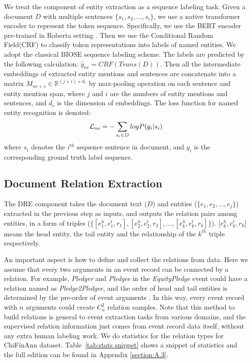 \documentclass[11pt]{article}
\begin{document}
We treat the component of entity extraction as a sequence labeling task. Given a document $D$ with multiple sentences $\{s_1,s_2,...,s_i\}$, we use a native transformer encoder to represent the token sequence. Specifically, we use the BERT \cite{bert} encoder pre-trained in Roberta setting \cite{roberta}. Then we use the Conditional Random Field(CRF) \cite{CRF} to classify token representations into labels of named entities. We adopt the classical BIOSE sequence labeling scheme. The labels are predicted by the following calculation: $\hat{y}_{ne} = CRF(Trans(D))$. Then all the intermediate embeddings of extracted entity mentions and sentences are concatenate into a matrix $M_{ne+s}\in \mathbb{R}^{(j+i)\times{d_e}}$ by max-pooling operation on each sentence and entity mention span, where $j$ and $i$ are the numbers of entity mentions and sentences, and $d_e$ is the dimension of embeddings. The loss function for named entity recognition is denoted:
\begin{equation}
\small
    \mathcal{L}_{ne}= -\sum_{s_i \in D} logP(y_i|s_i)
\end{equation}
where $s_i$ denotes the $i^{th}$ sequence sentence in document, and $y_i$ is the corresponding ground truth label sequence. 


\subsection{Document Relation Extraction}

The DRE component takes the document text ($D$) and entities ($\{e_1,e_2,...,e_j\}$) extracted in the previous step as inputs, and outputs the relation pairs among entities, in a form of triples ($\{[e_1^h,e_1^t,r_1],[e_2^h,e_2^t,r_2],...,[e_k^h,e_k^t,r_k]\}$). [$e_k^h,e_k^t,r_k$] means the head entity, the tail entity and the relationship of the $k^{th}$ triple respectively. 

An important aspect is how to define and collect the relations from data. Here we assume that every two arguments in an event record can be connected by a relation. For example, \textit{Pledger} and \textit{Pledgee} in the \textit{EquityPledge} event could have a relation named as \textit{Pledge2Pledgee}, and the order of head and tail entities is determined by the pre-order of event arguments \cite{Doc2EDAG}. In this way, every event record with $n$ arguments could create $C_n^2$ relation samples. Note that this method to build relations is general to event extraction tasks from various domains, and the supervised relation information just comes from event record data itself, without any extra human labeling work. We do statistics for the relation types for ChiFinAnn dataset. Table~\ref{tab:stats snippet} shows a snippet of statistics and the full edition can be found in Appendix \ref{section:A.3}.
\end{document}
